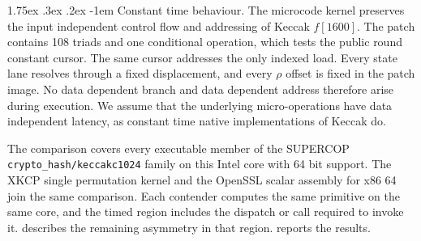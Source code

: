 \documentclass[journal=tches,submission]{iacrtrans}
\makeatletter
\renewcommand\paragraph{\@startsection{paragraph}{4}{\z@}%
      {1.75ex \@plus .3ex \@minus .2ex}%
      {-1em}%
      {\normalfont\normalsize\bfseries\SS@parafont}}
\makeatother
\begin{document}
\paragraph{Constant time behaviour.}
The microcode kernel preserves the input independent control flow and addressing of Keccak $f[1600]$.
The patch contains 108 triads and one conditional operation, which tests the public round constant cursor.
The same cursor addresses the only indexed load.
Every state lane resolves through a fixed displacement, and every $\rho$ offset is fixed in the patch image.
No data dependent branch and data dependent address therefore arise during execution.
We assume that the underlying micro-operations have data independent latency, as constant time native implementations of Keccak do.

The comparison covers every executable member of the SUPERCOP \texttt{crypto\_hash/\allowbreak keccakc1024} family on this Intel core with 64 bit support.
The XKCP single permutation kernel and the OpenSSL scalar assembly for x86 64 join the same comparison.
Each contender computes the same primitive on the same core, and the timed region includes the dispatch or call required to invoke it.
 describes the remaining asymmetry in that region.  reports the results.
\end{document}
